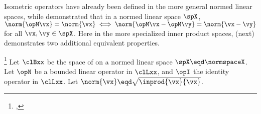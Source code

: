 Isometric operators have already been defined  in the more general normed linear spaces,
while  demonstrated that in a normed linear space $\spX$,
$\norm{\opM\vx}=\norm{\vx}\iff\norm{\opM\vx-\opM\vy}=\norm{\vx-\vy}$ for all $\vx,\vy\in\spX$.
Here in the more specialized inner product spaces,  (next) demonstrates two additional
equivalent properties.

\begin{theorem}
\footnote{
  ,
  }
\label{thm:op_inprodiso}
\label{thm:isometric_equiv}
Let $\clBxx $ be the space of  on a normed linear space $\spX\eqd\normspaceX$.
Let $\opN$ be a bounded linear operator in $\clLxx$, and
$\opI$ the identity operator in $\clLxx$.
Let $\norm{\vx}\eqd\sqrt{\inprod{\vx}{\vx}}$.
\end{theorem}
